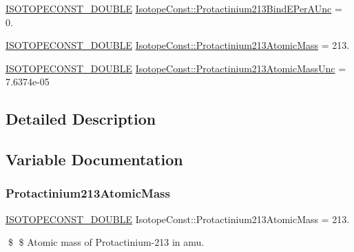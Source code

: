 \begin{DoxyCompactItemize}
\item 
\mbox{\hyperlink{group___isotope_const-_macros_ga8f45a7272ce02c0b4c65c44636ed719a}{I\+S\+O\+T\+O\+P\+E\+C\+O\+N\+S\+T\+\_\+\+D\+O\+U\+B\+LE}} \mbox{\hyperlink{group___isotope_const-_protactinium-_pa213_ga6e01ca5f4b192f2053307e94cd645923}{Isotope\+Const\+::\+Protactinium213\+Bind\+E\+Per\+A\+Unc}} = 0.
\item 
\mbox{\hyperlink{group___isotope_const-_macros_ga8f45a7272ce02c0b4c65c44636ed719a}{I\+S\+O\+T\+O\+P\+E\+C\+O\+N\+S\+T\+\_\+\+D\+O\+U\+B\+LE}} \mbox{\hyperlink{group___isotope_const-_protactinium-_pa213_ga01cabe9f77f0933e04f052248286668a}{Isotope\+Const\+::\+Protactinium213\+Atomic\+Mass}} = 213.
\item 
\mbox{\hyperlink{group___isotope_const-_macros_ga8f45a7272ce02c0b4c65c44636ed719a}{I\+S\+O\+T\+O\+P\+E\+C\+O\+N\+S\+T\+\_\+\+D\+O\+U\+B\+LE}} \mbox{\hyperlink{group___isotope_const-_protactinium-_pa213_ga7099cf113e5e8221e1b09528c2fecf86}{Isotope\+Const\+::\+Protactinium213\+Atomic\+Mass\+Unc}} = 7.\+6374e-\/05
\end{DoxyCompactItemize}


\subsection{Detailed Description}


\subsection{Variable Documentation}
\mbox{\label{group___isotope_const-_protactinium-_pa213_ga01cabe9f77f0933e04f052248286668a}} 
\subsubsection{\texorpdfstring{Protactinium213\+Atomic\+Mass}{Protactinium213AtomicMass}}
{\footnotesize\ttfamily \mbox{\hyperlink{group___isotope_const-_macros_ga8f45a7272ce02c0b4c65c44636ed719a}{I\+S\+O\+T\+O\+P\+E\+C\+O\+N\+S\+T\+\_\+\+D\+O\+U\+B\+LE}} Isotope\+Const\+::\+Protactinium213\+Atomic\+Mass = 213.}

\$ \$ Atomic mass of Protactinium-\/213 in amu. \mbox{\label{group___isotope_const-_protactinium-_pa213_ga7099cf113e5e8221e1b09528c2fecf86}} 
